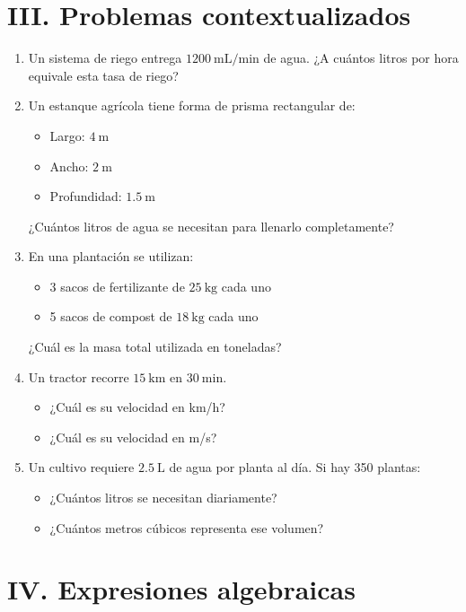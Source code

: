 \documentclass[12pt]{article}
\begin{document}
	\section*{III. Problemas contextualizados}
	
	\begin{enumerate}[itemsep=0.5cm]
		\item Un sistema de riego entrega $1200\ \text{mL/min}$ de agua.  
		¿A cuántos litros por hora equivale esta tasa de riego?
		
		\item Un estanque agrícola tiene forma de prisma rectangular de:
		\begin{itemize}
			\item Largo: $4\ \text{m}$
			\item Ancho: $2\ \text{m}$
			\item Profundidad: $1.5\ \text{m}$
		\end{itemize}
		¿Cuántos litros de agua se necesitan para llenarlo completamente?
		
		\item En una plantación se utilizan:
		\begin{itemize}
			\item 3 sacos de fertilizante de $25\ \text{kg}$ cada uno
			\item 5 sacos de compost de $18\ \text{kg}$ cada uno
		\end{itemize}
		¿Cuál es la masa total utilizada en toneladas?
		
		\item Un tractor recorre $15\ \text{km}$ en $30\ \text{min}$.
		\begin{itemize}
			\item ¿Cuál es su velocidad en km/h?
			\item ¿Cuál es su velocidad en m/s?
		\end{itemize}
		
		\item Un cultivo requiere $2.5\ \text{L}$ de agua por planta al día.  
		Si hay 350 plantas:
		\begin{itemize}
			\item ¿Cuántos litros se necesitan diariamente?
			\item ¿Cuántos metros cúbicos representa ese volumen?
		\end{itemize}
	\end{enumerate}
	
	\section*{IV. Expresiones algebraicas}
	
\end{document}
